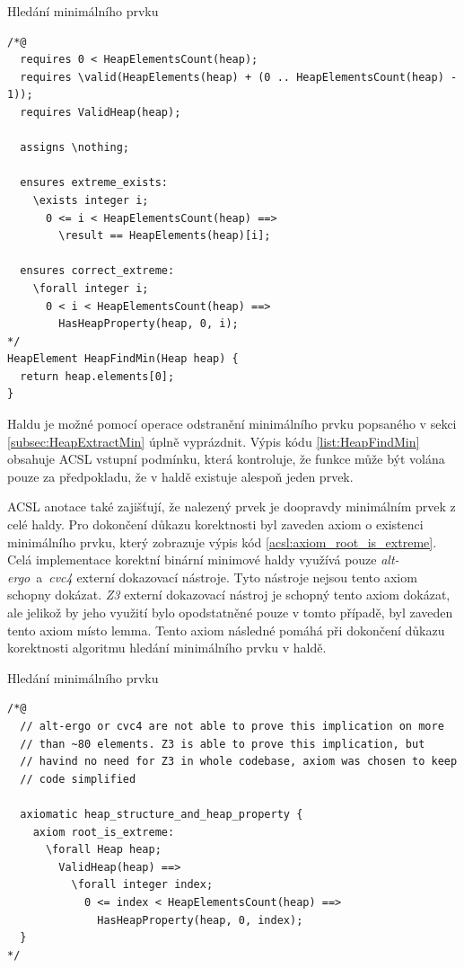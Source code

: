 \begin{listing}[H]
	\caption{Hledání minimálního prvku}
	\label{list:HeapFindMin}
	\begin{verbatim}
/*@
  requires 0 < HeapElementsCount(heap);
  requires \valid(HeapElements(heap) + (0 .. HeapElementsCount(heap) - 1));
  requires ValidHeap(heap);

  assigns \nothing;

  ensures extreme_exists:
    \exists integer i;
      0 <= i < HeapElementsCount(heap) ==>
        \result == HeapElements(heap)[i];

  ensures correct_extreme:
    \forall integer i;
      0 < i < HeapElementsCount(heap) ==>
        HasHeapProperty(heap, 0, i);
*/
HeapElement HeapFindMin(Heap heap) {
  return heap.elements[0];
}
	\end{verbatim}
\end{listing}

Haldu je možné pomocí operace odstranění minimálního prvku popsaného v sekci \ref{subsec:HeapExtractMin} úplně vyprázdnit. Výpis kódu \ref{list:HeapFindMin} obsahuje ACSL vstupní podmínku, která kontroluje, že funkce může být volána pouze za předpokladu, že v haldě existuje alespoň jeden prvek.

ACSL anotace také zajišťují, že nalezený prvek je doopravdy minimálním prvek z celé haldy. Pro dokončení důkazu korektnosti byl zaveden axiom o existenci minimálního prvku, který zobrazuje výpis kód \ref{acsl:axiom_root_is_extreme}. Celá implementace korektní binární minimové haldy využívá pouze \textit{alt-ergo}~a~\textit{cvc4} externí dokazovací nástroje. Tyto nástroje nejsou tento axiom schopny dokázat. \textit{Z3} externí dokazovací nástroj je schopný tento axiom dokázat, ale jelikož by jeho využití bylo opodstatněné pouze v tomto případě, byl zaveden tento axiom místo lemma. Tento axiom následné pomáhá při dokončení důkazu korektnosti algoritmu hledání minimálního prvku v haldě.

\begin{listing}[H]
	\caption{Hledání minimálního prvku}
	\label{acsl:axiom_root_is_extreme}
	\begin{verbatim}
/*@
  // alt-ergo or cvc4 are not able to prove this implication on more
  // than ~80 elements. Z3 is able to prove this implication, but
  // havind no need for Z3 in whole codebase, axiom was chosen to keep
  // code simplified

  axiomatic heap_structure_and_heap_property {
    axiom root_is_extreme:
      \forall Heap heap;
        ValidHeap(heap) ==>
          \forall integer index;
            0 <= index < HeapElementsCount(heap) ==>
              HasHeapProperty(heap, 0, index);
  }
*/
	\end{verbatim}
\end{listing}

